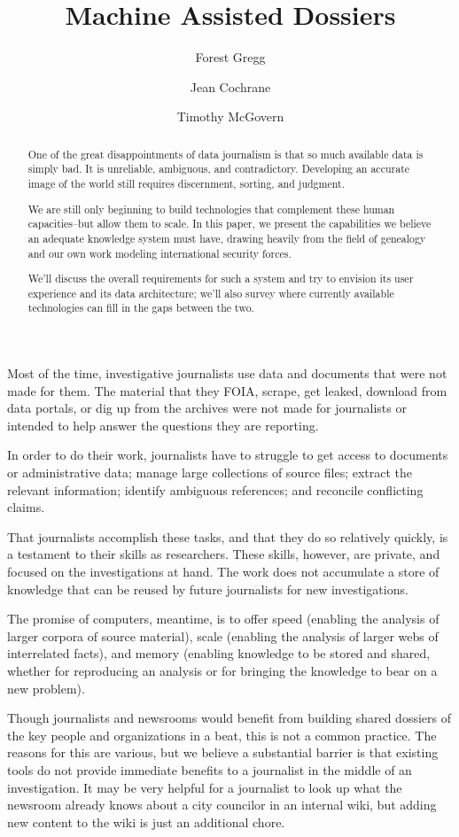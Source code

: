 \documentclass[format=siggraph, review=true]{acmart}
\title{Machine Assisted Dossiers}
\author{Forest Gregg}
\affiliation{DataMade}
\author{Jean Cochrane}
\affiliation{DataMade}
\author{Timothy McGovern}
\begin{document}
\begin{abstract}One of the great disappointments of data journalism is that so much
  available data is simply bad. It is unreliable, ambiguous, and
  contradictory. Developing an accurate image of the world still
  requires discernment, sorting, and judgment.

  We are still only beginning to build technologies that
  complement these human capacities--but allow them to
  scale. In this paper, we present the capabilities we believe an
  adequate knowledge system must have, drawing heavily from the field
  of genealogy and our own work modeling international security forces.

  We'll discuss the overall requirements for such a system and try to
  envision its user experience and its data architecture; we'll also
  survey where currently available technologies can fill in the gaps
  between the two.
\end{abstract}

\maketitle
Most of the time, investigative journalists use data and documents
that were not made for them. The material that they FOIA, scrape, get
leaked, download from data portals, or dig up from the archives
were not made for journalists or intended to help answer the
questions they are reporting.

In order to do their work, journalists have to struggle to get access
to documents or administrative data; manage large collections of
source files; extract the relevant information; identify ambiguous
references; and reconcile conflicting claims.

That journalists accomplish these tasks, and that they do so relatively quickly,
is a testament to their skills as researchers. These skills, however, are
private, and focused on the investigations at hand. The work does not
accumulate a store of knowledge that can be reused by future
journalists for new investigations.

The promise of computers, meantime, is to offer speed (enabling the
analysis of larger corpora of source material), scale (enabling the
analysis of larger webs of interrelated facts), and memory (enabling
knowledge to be stored and shared, whether for reproducing an analysis
or for bringing the knowledge to bear on a new problem).

Though journalists and newsrooms would benefit from building shared
dossiers of the key people and organizations in a beat, this is not a
common practice. The reasons for this are various, but we believe a
substantial barrier is that existing tools do not provide immediate
benefits to a journalist in the middle of an investigation. It may be
very helpful for a journalist to look up what the newsroom already
knows about a city councilor in an internal wiki, but adding new
content to the wiki is just an additional chore. 
\end{document}
